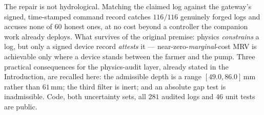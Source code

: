 The repair is not hydrological. Matching the claimed log against the gateway's
signed, time-stamped command record catches $116/116$ genuinely forged logs and
accuses none of $60$ honest ones, at no cost beyond a controller the companion
work already deploys. What survives of the original premise: physics
\emph{constrains} a log, but only a signed device record \emph{attests} it
--- near-zero-\emph{marginal}-cost MRV is achievable only where a device stands
between the
farmer and the pump. Three practical consequences for the physics-audit layer, already stated in the Introduction, are recalled here: the admissible depth is a range $[49.0,86.0]$\,mm rather than $61$\,mm; the third filter is inert; and an absolute gap test is inadmissible. Code, both uncertainty sets, all $281$
audited logs and $46$ unit tests are public.
